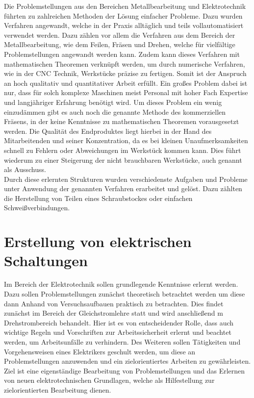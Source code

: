 Die Problemstellungen aus den Bereichen Metallbearbeitung und Elektrotechnik führten zu zahlreichen Methoden der Lösung einfacher Probleme. Dazu wurden 
Verfahren angewandt, welche in der Praxis alltäglich und teils vollautomatisiert verwendet werden. Dazu zählen vor allem die Verfahren aus dem Bereich der 
Metallbearbeitung, wie \zB dem Feilen, Fräsen und Drehen, welche für vielfältige Problemstellungen angewandt werden kann. Zudem kann dieses Verfahren mit 
mathematischen Theoremen verknüpft werden, um \zB durch numerische Verfahren, wie in der CNC Technik, Werkstücke präzise zu fertigen. Somit ist der Anspruch 
an hoch qualitativ und quantitativer Arbeit erfüllt. Ein großes Problem dabei ist nur, dass für solch komplexe Maschinen meist Personal mit hoher Fach 
Expertise und langjähriger Erfahrung benötigt wird. Um dieses Problem ein wenig einzudämmen gibt es auch noch die genannte Methode des kommerziellen Fräsens, 
in der keine Kenntnisse zu mathematischen Theoremen vorausgesetzt werden. Die Qualität des Endproduktes liegt hierbei in der Hand des Mitarbeitenden und 
seiner Konzentration, da es bei kleinen Unaufmerksamkeiten schnell zu Fehlern oder Abweichungen im Werkstück kommen kann. Dies führt wiederum zu einer
Steigerung der nicht brauchbaren Werkstücke, auch genannt als Ausschuss. 
\\
Durch diese erlernten Strukturen wurden verschiedenste Aufgaben und Probleme unter Anwendung der genannten Verfahren erarbeitet und gelöst. Dazu zählten \zB 
die Herstellung von Teilen eines Schraubstockes oder einfachen Schweißverbindungen.
\clearpage


\section{Erstellung von elektrischen Schaltungen}

Im Bereich der Elektrotechnik sollen grundlegende Kenntnisse erlernt werden. Dazu sollen Problemstellungen zunächst theoretisch 
betrachtet werden um diese dann Anhand von Versuchsaufbauen praktisch zu betrachten. Dies findet zunächst im Bereich der Gleichstromlehre statt und 
wird anschließend m Drehstrombereich behandelt. Hier ist es von entscheidender Rolle, dass auch wichtige Regeln und Vorschriften zur Arbeitssicherheit 
erlernt und beachtet werden, um Arbeitsunfälle zu verhindern. Des Weiteren sollen Tätigkeiten und Vorgehensweisen eines Elektrikers geschult werden, um 
diese an Problemstellungen anzuwenden und ein zielorientiertes Arbeiten zu gewährleisten. 
\\
Ziel ist eine eigenständige Bearbeitung von Problemstellungen und das Erlernen von neuen elektrotechnischen Grundlagen, welche als Hilfestellung zur 
zielorientierten Bearbeitung dienen. 
\clearpage

